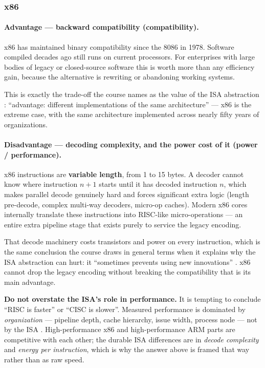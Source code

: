 \subsubsection*{x86}

\paragraph{Advantage --- backward compatibility (compatibility).}
x86 has maintained binary compatibility since the 8086 in 1978. Software
compiled decades ago still runs on current processors. For enterprises with
large bodies of legacy or closed-source software this is worth more than any
efficiency gain, because the alternative is rewriting or abandoning working
systems.

This is exactly the trade-off the course names as the value of the ISA
abstraction : ``advantage: different implementations
of the same architecture'' — x86 is the extreme case, with the same architecture
implemented across nearly fifty years of organizations.

\paragraph{Disadvantage --- decoding complexity, and the power cost of it (power / performance).}
x86 instructions are \textbf{variable length}, from 1 to 15 bytes. A decoder
cannot know where instruction $n+1$ starts until it has decoded instruction $n$,
which makes parallel decode genuinely hard and forces significant extra logic
(length pre-decode, complex multi-way decoders, micro-op caches). Modern x86
cores internally translate these instructions into RISC-like micro-operations —
an entire extra pipeline stage that exists purely to service the legacy
encoding.

That decode machinery costs transistors and power on every instruction, which is
the same conclusion the course draws in general terms when it explains why the
ISA abstraction can hurt: it ``sometimes prevents using new innovations''
. x86 cannot drop the legacy encoding without breaking
the compatibility that is its main advantage.


\begin{trap}
\textbf{Do not overstate the ISA's role in performance.} It is tempting to
conclude ``RISC is faster'' or ``CISC is slower''. Measured performance is
dominated by \emph{organization} — pipeline depth, cache hierarchy, issue width,
process node — not by the ISA . High-performance x86
and high-performance ARM parts are competitive with each other; the durable ISA
differences are in \emph{decode complexity} and \emph{energy per instruction},
which is why the answer above is framed that way rather than as raw speed.
\end{trap}


